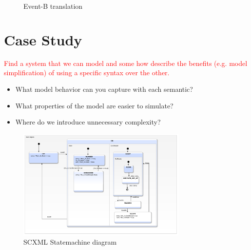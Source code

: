 \documentclass{easychair}
\begin{document}
\begin{figure}[tbp!]
  \caption{Event-B translation} 
  \label{fig:event-b}
\end{figure}








\section{Case Study}
\label{sect:caseS}

\textcolor{red}{Find a system that we can model and some how describe the benefits 
(e.g. model simplification) of using a specific syntax over the other.}
	\begin{itemize}
		\item What model behavior can you capture with each semantic?
		\item What properties of the model are easier to simulate?
		\item Where do we introduce unnecessary complexity?
	\end{itemize}	

\begin{figure}[]
  \begin{centering}
  \includegraphics[width=0.75\textwidth]{caseStudy/TurnstileSimpleModel}
  \caption{SCXML Statemachine diagram}
  \label{fig:StatemachineSCXML}
  \end{centering}
\end{figure} 
\end{document}
